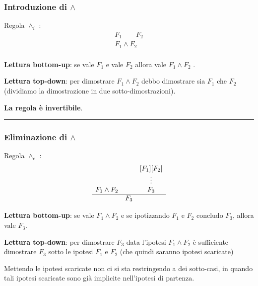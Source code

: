 \documentclass[
  a4paper,
]{article}
\begin{document}
\hypertarget{introduzione-di-land}{%
\subsubsection{\texorpdfstring{Introduzione di
\(\land\)}{Introduzione di \textbackslash land}}\label{introduzione-di-land}}

Regola \(\land_i\) : \[
\begin{matrix} 
F_1 \quad \quad F_2 \\
\hline
F_1 \land F_2 \\
\end{matrix}
\]

\textbf{Lettura bottom-up}: se vale \(F_1\) e vale \(F_2\) allora vale
\(F_1 \land F_2\) .

\textbf{Lettura top-down}: per dimostrare \(F_1 \land F_2\) debbo
dimostrare sia \(F_1\) che \(F_2\) (dividiamo la dimostrazione in due
sotto-dimostrazioni).

\textbf{La regola è invertibile}.

\par\noindent\rule{\linewidth}{0.4pt}\par\vspace{6pt}

\hypertarget{eliminazione-di-land}{%
\subsubsection{\texorpdfstring{Eliminazione di
\(\land\)}{Eliminazione di \textbackslash land}}\label{eliminazione-di-land}}

Regola \(\land_e\) : \[
\begin{matrix} 
&&[F_1]  [F_2] \\
&&\vdots \\
F_1 \land F_2 && F_3 \\
\hline
& F_3 
\end{matrix}
\]

\textbf{Lettura bottom-up}: se vale \(F_1 \land F_2\) e se ipotizzando
\(F_1\) e \(F_2\) concludo \(F_3\), allora vale \(F_3\).

\textbf{Lettura top-down}: per dimostrare \(F_3\) data l'ipotesi
\(F_1 \land F_2\) è sufficiente dimostrare \(F_3\) sotto le ipotesi
\(F_1\) e \(F_2\) (che quindi saranno ipotesi scaricate)

Mettendo le ipotesi scaricate non ci si sta restringendo a dei
sotto-casi, in quando tali ipotesi scaricate sono già implicite
nell'ipotesi di partenza.
\end{document}
